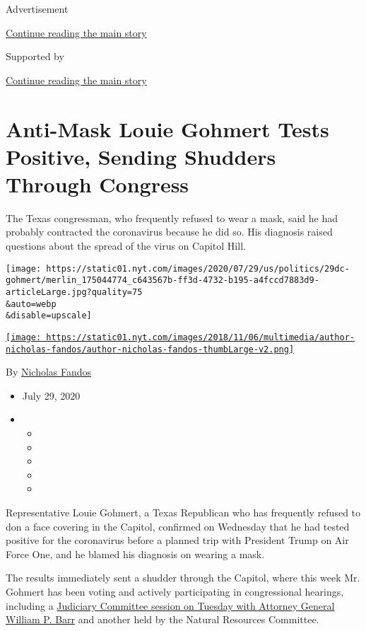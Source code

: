 Advertisement

\protect\hyperlink{after-top}{Continue reading the main story}

Supported by

\protect\hyperlink{after-sponsor}{Continue reading the main story}

\hypertarget{anti-mask-louie-gohmert-tests-positive-sending-shudders-through-congress}{%
\section{Anti-Mask Louie Gohmert Tests Positive, Sending Shudders
Through
Congress}\label{anti-mask-louie-gohmert-tests-positive-sending-shudders-through-congress}}

The Texas congressman, who frequently refused to wear a mask, said he
had probably contracted the coronavirus because he did so. His diagnosis
raised questions about the spread of the virus on Capitol Hill.

\texttt{[image: https://static01.nyt.com/images/2020/07/29/us/politics/29dc-gohmert/merlin\_175044774\_c643567b-ff3d-4732-b195-a4fccd7883d9-articleLarge.jpg?quality=75\\\&auto=webp\\\&disable=upscale]}

\href{https://www.nytimes.com/by/nicholas-fandos}{\texttt{[image: https://static01.nyt.com/images/2018/11/06/multimedia/author-nicholas-fandos/author-nicholas-fandos-thumbLarge-v2.png]}}

By \href{https://www.nytimes.com/by/nicholas-fandos}{Nicholas Fandos}

\begin{itemize}
\item
  July 29, 2020
\item
  \begin{itemize}
  \item
  \item
  \item
  \item
  \item
  \end{itemize}
\end{itemize}

Representative Louie Gohmert, a Texas Republican who has frequently
refused to don a face covering in the Capitol, confirmed on Wednesday
that he had tested positive for the coronavirus before a planned trip
with President Trump on Air Force One, and he blamed his diagnosis on
wearing a mask.

The results immediately sent a shudder through the Capitol, where this
week Mr. Gohmert has been voting and actively participating in
congressional hearings, including a
\href{https://www.nytimes.com/2020/07/28/us/politics/barr-testimony.html}{Judiciary
Committee session on Tuesday with Attorney General William P. Barr} and
another held by the Natural Resources Committee.

